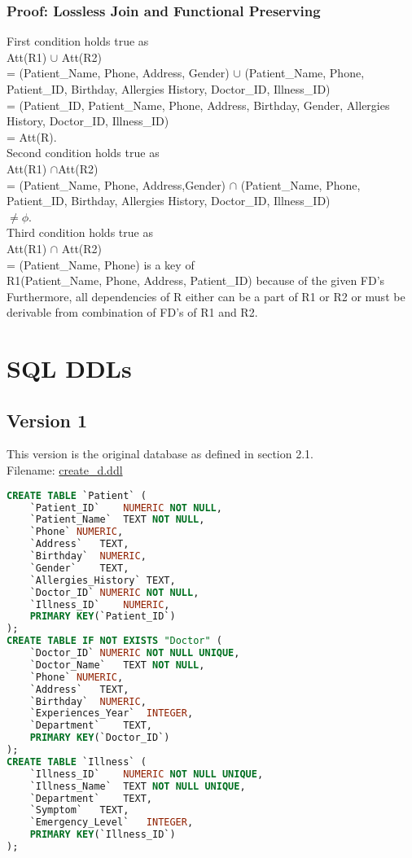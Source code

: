 \documentclass[12pt,arial]{article}
\begin{document}
\subsubsection{Proof: Lossless Join and Functional Preserving}
First condition holds true as \\Att(R1) $\cup$ Att(R2) \\= (Patient\_Name, Phone, Address, Gender) $\cup$ (Patient\_Name, Phone, Patient\_ID, Birthday, Allergies History, Doctor\_ID, Illness\_ID) \\= (Patient\_ID, Patient\_Name, Phone, Address, Birthday, Gender, Allergies History, Doctor\_ID, Illness\_ID)\\= Att(R).\\ \hfil \break
Second condition holds true as \\Att(R1) $\cap$Att(R2) \\= (Patient\_Name, Phone, Address,Gender) $\cap$ (Patient\_Name, Phone, Patient\_ID, Birthday, Allergies History, Doctor\_ID, Illness\_ID) \\$\neq \phi$.\\ \hfil \break
Third condition holds true as \\Att(R1) $\cap$ Att(R2) \\= (Patient\_Name, Phone) is a key of \\R1(Patient\_Name, Phone, Address, Patient\_ID) because of the given FD's\\ \hfil \break
Furthermore, all dependencies of R either can be a part of R1 or R2 or must be derivable from combination of FD’s of R1 and R2.


\section{SQL DDLs}
\subsection{Version 1}
This version is the original database as defined in section 2.1.\\
Filename: \url{create_d.ddl}
\begin{lstlisting}[language=SQL]
	CREATE TABLE `Patient` (
	`Patient_ID`	NUMERIC NOT NULL,
	`Patient_Name`	TEXT NOT NULL,
	`Phone`	NUMERIC,
	`Address`	TEXT,
	`Birthday`	NUMERIC,
	`Gender`	TEXT,
	`Allergies_History`	TEXT,
	`Doctor_ID`	NUMERIC NOT NULL,
	`Illness_ID`	NUMERIC,
	PRIMARY KEY(`Patient_ID`)
);
CREATE TABLE IF NOT EXISTS "Doctor" (
	`Doctor_ID`	NUMERIC NOT NULL UNIQUE,
	`Doctor_Name`	TEXT NOT NULL,
	`Phone`	NUMERIC,
	`Address`	TEXT,
	`Birthday`	NUMERIC,
	`Experiences_Year`	INTEGER,
	`Department`	TEXT,
	PRIMARY KEY(`Doctor_ID`)
);
CREATE TABLE `Illness` (
	`Illness_ID`	NUMERIC NOT NULL UNIQUE,
	`Illness_Name`	TEXT NOT NULL UNIQUE,
	`Department`	TEXT,
	`Symptom`	TEXT,
	`Emergency_Level`	INTEGER,
	PRIMARY KEY(`Illness_ID`)
);
\end{lstlisting}
\end{document}
